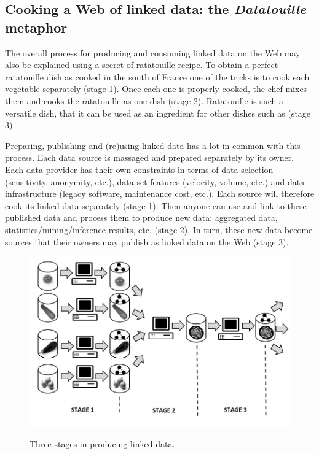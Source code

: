 \hypertarget{cooking-a-web-of-linked-data-the-datatouille-metaphor}{%
\subsection{\texorpdfstring{Cooking a Web of linked data: the
\emph{Datatouille}
metaphor}{Cooking a Web of linked data: the Datatouille metaphor}}\label{cooking-a-web-of-linked-data-the-datatouille-metaphor}}

The overall process for producing and consuming linked data on the Web
may also be explained using a secret of ratatouille recipe. To obtain a
perfect ratatouille dish as cooked in the south of France one of the
tricks is to cook each vegetable separately (stage 1). Once each one is
properly cooked, the chef mixes them and cooks the ratatouille as one
dish (stage 2). Ratatouille is such a versatile dish, that it can be
used as an ingredient for other dishes such as (stage 3).

Preparing, publishing and (re)using linked data has a lot in common with
this process. Each data source is massaged and prepared separately by
its owner. Each data provider has their own
constraints in terms of data selection (sensitivity, anonymity, etc.),
data set features (velocity, volume, etc.) and data infrastructure
(legacy software, maintenance cost, etc.). Each source will therefore
cook its linked data separately (stage 1). Then anyone can use and link
to these published data and process them to produce new data: aggregated
data, statistics/mining/inference results, etc. (stage 2). In turn,
these new data become sources that their owners may publish as linked
data on the Web (stage 3).

\begin{figure}

\includegraphics[width=5in]{media/ch5/figure-05-13x}
\label{fig:ch5.13x}
\caption{Three stages in producing linked data.}
\end{figure}

